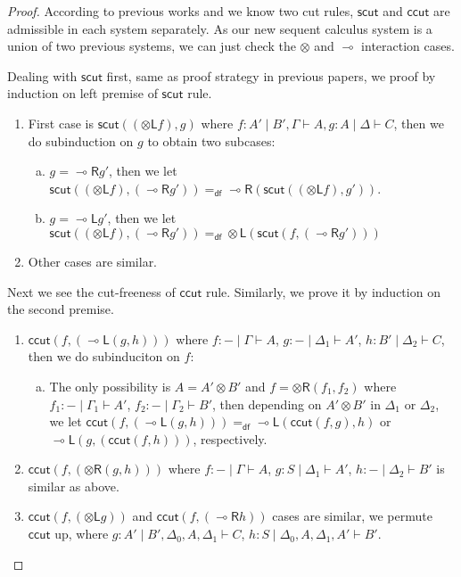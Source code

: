\documentclass[submission,copyright,creativecommons]{eptcs}
\newcommand{\tl}{\otimes \mathsf{L}}
\newcommand{\tr}{\otimes \mathsf{R}}
\newcommand{\lright}{\multimap \mathsf{R}}
\newcommand{\lleft}{\multimap \mathsf{L}}
\newcommand{\ot}{\otimes}
\newcommand{\lolli}{\multimap}
\newcommand{\defeq}{=_{\mathsf{df}}}
\begin{document}
\begin{proof}
  According to previous works \cite{uustalu:sequent:2018} and \cite{uustalu:deductive:nodate} we know two cut rules, $\mathsf{scut}$ and $\mathsf{ccut}$ are admissible in each system separately.
  As our new sequent calculus system is a union of two previous systems, we can just check the $\ot$ and $\lolli$ interaction cases.

  Dealing with $\mathsf{scut}$ first, same as proof strategy in previous papers, we proof by induction on left premise of $\mathsf{scut}$ rule.
  \begin{enumerate}[1. ]
    \item First case is $\mathsf{scut} ((\tl f), g)$ where $f : A' \mid B' , \Gamma \vdash A, g : A \mid \Delta \vdash C$, then we do subinduction on $g$ to obtain two subcases:
          \begin{enumerate}[a. ]
            \item $g = \lright g'$, then we let $\mathsf{scut} ((\tl f), (\lright g')) \defeq \lright (\mathsf{scut} ((\tl f), g'))$.
            \item $g = \lleft g'$, then we let $\mathsf{scut} ((\tl f), (\lright g')) \defeq \tl (\mathsf{scut} (f, (\lright g')))$
          \end{enumerate}
    \item Other cases are similar.
  \end{enumerate}
  Next we see the cut-freeness of $\mathsf{ccut}$ rule.
  Similarly, we prove it by induction on the second premise.
  \begin{enumerate}[1. ]
    \item $\mathsf{ccut} (f , (\lleft (g, h)))$ where $f : - \mid \Gamma \vdash A$, $g : - \mid \Delta_1 \vdash A'$, $h : B' \mid \Delta_2 \vdash C$, then we do subinduciton on $f$:
    \begin{enumerate}[a. ]
      \item The only possibility is $A = A' \ot B'$ and $f = \tr (f_1, f_2)$ where $f_1 : - \mid \Gamma_1 \vdash A'$, $f_2 : - \mid \Gamma_2 \vdash B'$, then depending on $A' \ot B'$ in $\Delta_1$ or $\Delta_2$,
      we let $\mathsf{ccut} (f , (\lleft (g, h))) \defeq \lleft (\mathsf{ccut} (f, g), h)$ or $ \lleft (g, (\mathsf{ccut} (f, h)))$, respectively.
    \end{enumerate}
    \item $\mathsf{ccut} (f , (\tr (g, h)))$ where $f : - \mid \Gamma \vdash A$, $g : S \mid \Delta_1 \vdash A'$, $h : - \mid \Delta_2 \vdash B'$ is similar as above.
    \item $\mathsf{ccut} (f, (\tl g))$ and
    $\mathsf{ccut} (f, (\lright h))$ cases are similar, we permute $\mathsf{ccut}$ up,
    where $g : A' \mid B' , \Delta_0 , A , \Delta_1 \vdash C$, $h : S \mid \Delta_0 , A , \Delta_1 , A' \vdash B'$.
  \end{enumerate}
\end{proof}
\end{document}
